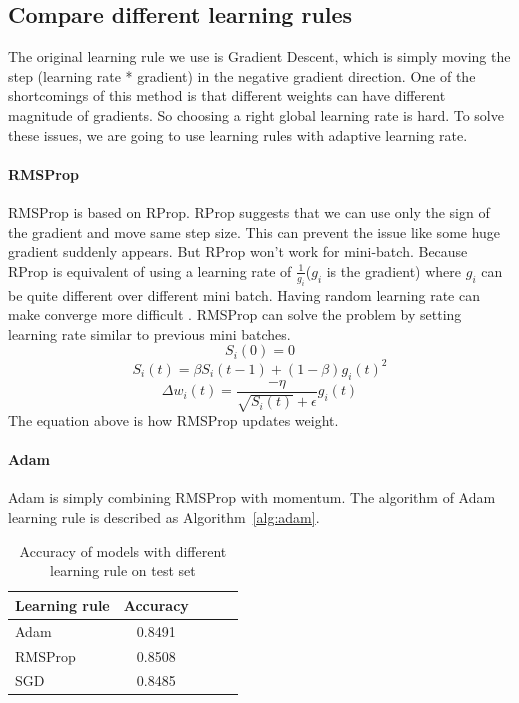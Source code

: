 \documentclass{article}
\begin{document}
\subsection{Compare different learning rules}
The original learning rule we use is  Gradient Descent, which is simply moving the step (learning rate * gradient) in the negative gradient direction. One of the shortcomings of this method is that different weights can have different magnitude of gradients. So choosing a right global learning rate is hard. To solve these issues, we are going to use learning rules with adaptive learning rate.

\paragraph{RMSProp} RMSProp \citep{Tieleman2012} is based on RProp\citep{rprop}. RProp suggests that we can use only the sign of the gradient and move same step size. This can prevent the issue like some huge gradient suddenly appears. But RProp won't work for mini-batch. Because RProp is equivalent of using a learning rate of $ \frac{1}{g_i}$($g_i$ is the gradient) where $g_i$ can be quite different over different mini batch. Having random learning rate can make converge more difficult \citep{Tieleman2012}. RMSProp can solve the problem by setting learning rate similar to previous mini batches. 
  $$S_i(0) = 0$$
  $$S_i(t) = \beta S_i(t-1) + (1 - \beta)g_i(t)^2$$
  $$ \Delta w_i(t) = \frac{ -\eta }{ \sqrt{S_i(t)} + \epsilon } g_i(t)$$
  The equation above is how RMSProp updates weight. 
\paragraph{Adam} Adam \citep{DBLP:journals/corr/KingmaB14} is simply combining RMSProp with momentum.  The algorithm of Adam learning rule is described as Algorithm~\ref{alg:adam}.

 


\begin{table}[tb]
\vskip 3mm
\begin{center}
\begin{small}
\begin{sc}
\begin{tabular}{lcccr}
\hline
\abovespace\belowspace
Learning rule & Accuracy \\
\hline
\abovespace
Adam    	& 0.8491 	\\
RMSProp	 	& 0.8508 	\\
SGD			& 0.8485 	\\

\hline
\end{tabular}
\end{sc}
\end{small}
\caption{Accuracy of models with different learning rule on test set}
\label{tab:lr}
\end{center}
\vskip -3mm
\end{table}
\end{document}
